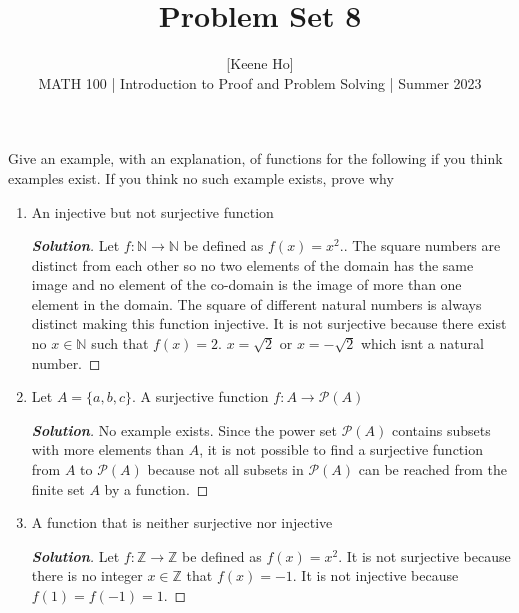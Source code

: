 \documentclass[11pt]{article}
\newenvironment{problem}[2][Problem\!]{\begin{trivlist}
\item[\hskip \labelsep {\bfseries #1}\hskip \labelsep {\bfseries #2.}]}{\end{trivlist}}
\newenvironment{solution}{\begin{proof}[\textbf{\textit{Solution}}]}{\end{proof}}
\begin{document}
 
\title{Problem Set 8}
\author{[Keene Ho]\\[0.5em]
MATH 100 | Introduction to Proof and Problem Solving | Summer 2023}
\date{} 
\maketitle


\begin{problem}{8.1}
Give an example, with an explanation, of functions for the following if you think examples exist. If you think no such example exists, prove why \begin{enumerate}
    \item [(a)] An injective but not surjective function
    \begin{solution}
    Let \(f: \mathbb{N} \to \mathbb{N}\) be defined as \(f(x) = x^2.\). The square numbers are distinct from each other so no two elements of the domain has the same image and no element of the co-domain is the image of more than one element in the domain. The square of different natural numbers is always distinct making this function injective. It is not surjective because there exist no \(x \in \mathbb{N}\) such that \(f(x) = 2\). \(x = \sqrt{2} \text{ or } x = -\sqrt{2}\) which isnt a natural number.
    \end{solution}
    \item [(b)] Let \(A = \{a,b,c\}\). A surjective function \(f: A \to \mathcal{P}(A)\) 
    \begin{solution}
    No example exists. Since the power set \(\mathcal{P}(A)\) contains subsets with more elements than \(A\), it is not possible to find a surjective function from \(A\) to \(\mathcal{P}(A)\) because not all subsets in \(\mathcal{P}(A)\) can be reached from the finite set \(A\) by a function.
    \end{solution}
    \item [(c)] A function that is neither surjective nor injective 
    \begin{solution}
    Let \(f: \mathbb{Z} \to \mathbb{Z}\) be defined as \(f(x) = x^2\). It is not surjective because there is no integer \(x \in \mathbb{Z}\) that \(f(x) = -1\). It is not injective because \(f(1) = f(-1) = 1\).
    \end{solution}

\end{enumerate}
\end{problem}
\end{document}
